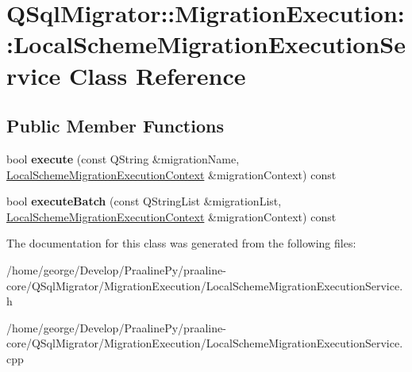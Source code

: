 \hypertarget{class_q_sql_migrator_1_1_migration_execution_1_1_local_scheme_migration_execution_service}{}\section{Q\+Sql\+Migrator\+:\+:Migration\+Execution\+:\+:Local\+Scheme\+Migration\+Execution\+Service Class Reference}
\label{class_q_sql_migrator_1_1_migration_execution_1_1_local_scheme_migration_execution_service}
\subsection*{Public Member Functions}
\begin{DoxyCompactItemize}
\item 
\mbox{\label{class_q_sql_migrator_1_1_migration_execution_1_1_local_scheme_migration_execution_service_a01247898257920934b3e316bd8207161}} 
bool {\bfseries execute} (const Q\+String \&migration\+Name, \hyperlink{class_q_sql_migrator_1_1_migration_execution_1_1_local_scheme_migration_execution_context}{Local\+Scheme\+Migration\+Execution\+Context} \&migration\+Context) const
\item 
\mbox{\label{class_q_sql_migrator_1_1_migration_execution_1_1_local_scheme_migration_execution_service_a7896a3b6b41d243fa828126e6261e3e6}} 
bool {\bfseries execute\+Batch} (const Q\+String\+List \&migration\+List, \hyperlink{class_q_sql_migrator_1_1_migration_execution_1_1_local_scheme_migration_execution_context}{Local\+Scheme\+Migration\+Execution\+Context} \&migration\+Context) const
\end{DoxyCompactItemize}


The documentation for this class was generated from the following files\+:\begin{DoxyCompactItemize}
\item 
/home/george/\+Develop/\+Praaline\+Py/praaline-\/core/\+Q\+Sql\+Migrator/\+Migration\+Execution/Local\+Scheme\+Migration\+Execution\+Service.\+h\item 
/home/george/\+Develop/\+Praaline\+Py/praaline-\/core/\+Q\+Sql\+Migrator/\+Migration\+Execution/Local\+Scheme\+Migration\+Execution\+Service.\+cpp\end{DoxyCompactItemize}
